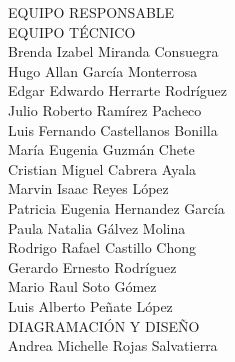 {\Bold \LARGE EQUIPO RESPONSABLE}\\[2cm]
{\Bold \large \color{color1!89!black} EQUIPO TÉCNICO}\\[0.2cm]
Brenda Izabel Miranda Consuegra\\
Hugo Allan García Monterrosa\\
Edgar Edwardo Herrarte Rodríguez\\
Julio Roberto Ramírez Pacheco \\
Luis Fernando Castellanos Bonilla \\
María Eugenia Guzmán Chete\\
Cristian Miguel Cabrera Ayala\\
Marvin Isaac Reyes López\\
Patricia Eugenia Hernandez García\\
Paula Natalia Gálvez Molina\\
Rodrigo Rafael Castillo Chong\\
Gerardo Ernesto Rodríguez\\
Mario Raul Soto Gómez\\
Luis Alberto Peñate López\\[0.8cm]
{\Bold \large \color{color1!89!black} DIAGRAMACIÓN Y DISEÑO}\\[0.2cm]
Andrea Michelle Rojas Salvatierra\\[0.8cm]
